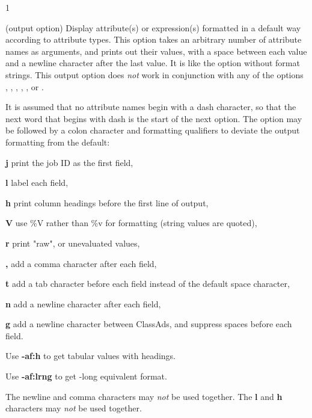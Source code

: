 \begin{ManPage}{\label{man-condor-q}}{1}
\begin{Options}
{   {
    (output option) Display attribute(s) or expression(s)
    formatted in a default way according to attribute types.  
    This option takes an arbitrary number of attribute names as arguments,
    and prints out their values, 
    with a space between each value and a newline character after 
    the last value.  
    It is like the  option without format strings.
    This output option does \emph{not} work in conjunction with any of the
    options , , , 
    , , or .

    It is assumed that no attribute names begin with a dash character,
    so that the next word that begins with dash is the 
    start of the next option.
    The  option may be followed by a colon character
    and formatting qualifiers to deviate the output formatting from
    the default:

    \textbf{j} print the job ID as the first field,

    \textbf{l} label each field,

    \textbf{h} print column headings before the first line of output,

    \textbf{V} use \%V rather than \%v for formatting (string values
    are quoted),

    \textbf{r} print "raw", or unevaluated values,

    \textbf{,} add a comma character after each field,

    \textbf{t} add a tab character before each field instead of 
    the default space character,

    \textbf{n} add a newline character after each field,

    \textbf{g} add a newline character between ClassAds, and
    suppress spaces before each field.

    Use \textbf{-af:h} to get tabular values with headings.

    Use \textbf{-af:lrng} to get -long equivalent format.

    The newline and comma characters may \emph{not} be used together.
    The \textbf{l} and \textbf{h} characters may \emph{not} be used
    together.
    }
  }
\end{Options}
\end{ManPage}
